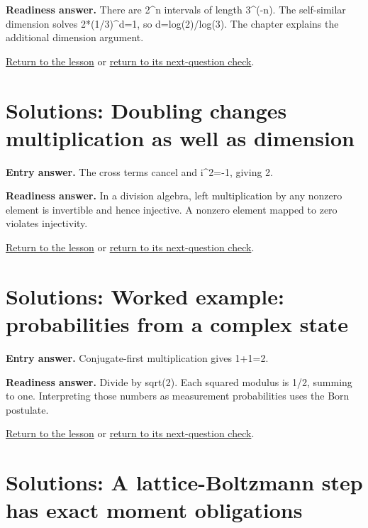 \label{solution:ready:geometry}

\textbf{Readiness answer.} There are 2\textasciicircum{}n intervals of length 3\textasciicircum{}(-n). The self-similar dimension solves 2*(1/3)\textasciicircum{}d=1, so d=log(2)/log(3). The chapter explains the additional dimension argument.\par

\hyperref[learn:geometry]{Return to the lesson} or \hyperref[readiness:geometry]{return to its next-question check}.

\section{Solutions: Doubling changes multiplication as well as dimension}

\label{solution:entry:hypercomplex}

\textbf{Entry answer.} The cross terms cancel and i\textasciicircum{}2=-1, giving 2.\par

\label{solution:ready:hypercomplex}

\textbf{Readiness answer.} In a division algebra, left multiplication by any nonzero element is invertible and hence injective. A nonzero element mapped to zero violates injectivity.\par

\hyperref[learn:hypercomplex]{Return to the lesson} or \hyperref[readiness:hypercomplex]{return to its next-question check}.

\section{Solutions: Worked example: probabilities from a complex state}

\label{solution:entry:quantum}

\textbf{Entry answer.} Conjugate-first multiplication gives 1+1=2.\par

\label{solution:ready:quantum}

\textbf{Readiness answer.} Divide by sqrt(2). Each squared modulus is 1/2, summing to one. Interpreting those numbers as measurement probabilities uses the Born postulate.\par

\hyperref[learn:quantum]{Return to the lesson} or \hyperref[readiness:quantum]{return to its next-question check}.

\section{Solutions: A lattice-Boltzmann step has exact moment obligations}

